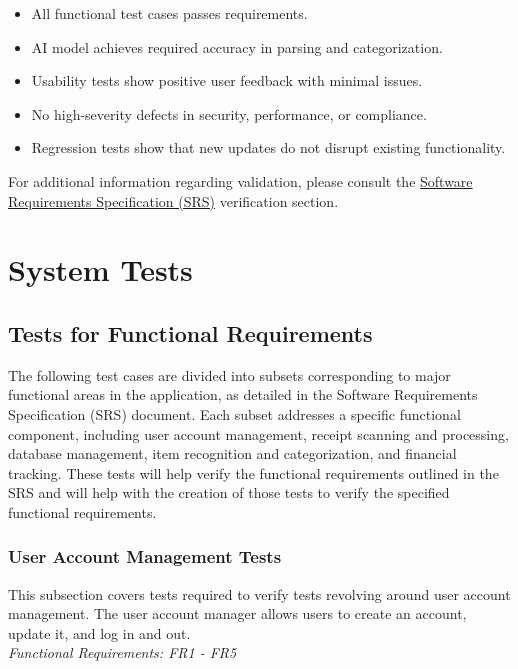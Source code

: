 \documentclass[12pt, titlepage]{article}
\begin{document}
\begin{enumerate}
	\begin{itemize}
		\item All functional test cases passes requirements.
		\item AI model achieves required accuracy in parsing and categorization.
		\item Usability tests show positive user feedback with minimal issues.
		\item No high-severity defects in security, performance, or compliance.
		\item Regression tests show that new updates do not disrupt existing functionality.
	\end{itemize}
\end{enumerate}

\noindent For additional information regarding validation, please consult the \href{https://github.com/PlutosCapstone/Plutos/blob/main/docs/SRS/SRS.pdf}{Software Requirements Specification (SRS)} verification section.

\newpage
\section{System Tests}

\subsection{Tests for Functional Requirements}

The following test cases are divided into subsets corresponding to major functional areas in the application, as detailed in the Software Requirements Specification (SRS) document. 
Each subset addresses a specific functional component, including user account management, receipt scanning and processing, database management, item recognition and categorization, and financial tracking. 
These tests will help verify the functional requirements outlined in the SRS and will help with the creation of those tests to verify the specified functional requirements.

\subsubsection{User Account Management Tests}

This subsection covers tests required to verify tests revolving around user account management. The user account manager allows users to create an account, update it, and log in and out.\\
\textit{Functional Requirements: FR1 - FR5}
\end{document}

